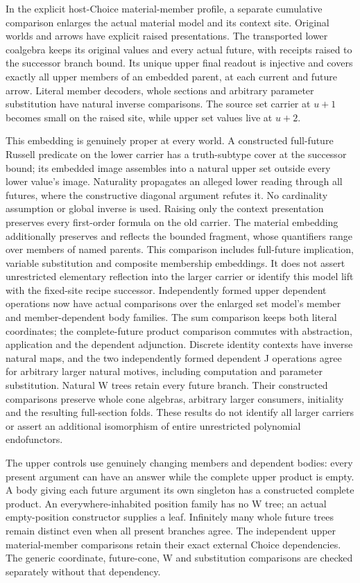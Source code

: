 \documentclass[11pt]{article}
\theoremstyle{definition}
\theoremstyle{remark}
\begin{document}
In the explicit host-Choice material-member profile, a separate cumulative
comparison enlarges the actual material model and its context site.
Original worlds and arrows have explicit raised
presentations. The transported lower coalgebra keeps its original values
and every actual future, with receipts raised to the successor branch
bound. Its unique upper final readout is injective and covers exactly
all upper members of an embedded parent, at each current and future
arrow. Literal member decoders, whole sections and arbitrary parameter
substitution have natural inverse comparisons. The source set carrier
at \(u+1\) becomes small on the raised site, while upper set values
live at \(u+2\).

This embedding is genuinely proper at every world. A constructed
full-future Russell predicate on the lower carrier has a truth-subtype
cover at the successor bound; its embedded image assembles into a
natural upper set outside every lower value's image. Naturality
propagates an alleged lower reading through all futures, where the
constructive diagonal argument refutes it. No cardinality assumption
or global inverse is used. Raising only the context presentation
preserves every first-order formula on the old carrier. The material
embedding additionally preserves and reflects the bounded fragment,
whose quantifiers range over members of named parents. This comparison
includes full-future implication, variable substitution and composite
membership embeddings. It does not assert unrestricted elementary
reflection into the larger carrier or identify this model lift with
the fixed-site recipe successor. Independently formed upper dependent
operations now have actual comparisons over the enlarged set model's
member and member-dependent body families. The sum comparison keeps
both literal coordinates; the complete-future product comparison
commutes with abstraction, application and the dependent adjunction.
Discrete identity contexts have inverse natural maps, and the two
independently formed dependent J operations agree for arbitrary larger
natural motives, including computation and parameter substitution.
Natural W trees retain every future branch. Their constructed
comparisons preserve whole cone algebras, arbitrary larger consumers,
initiality and the resulting full-section folds. These results do not
identify all larger carriers or assert an additional isomorphism of
entire unrestricted polynomial endofunctors.

The upper controls use genuinely changing members and dependent bodies:
every present argument can have an answer while the complete upper
product is empty. A body giving each future argument its own singleton
has a constructed complete product. An everywhere-inhabited position
family has no W tree; an actual empty-position constructor supplies a
leaf. Infinitely many whole future trees remain distinct even when
all present branches agree. The independent upper material-member
comparisons retain their exact external Choice dependencies. The generic
coordinate, future-cone, W and substitution comparisons are checked
separately without that dependency.
\end{document}
